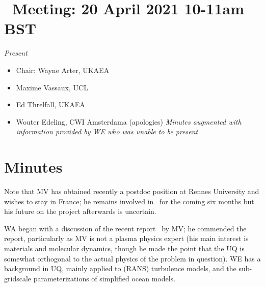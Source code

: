 \section{{\nep\  Meeting: 20 April 2021 10-11am 
BST}}

\emph{Present}

\begin{itemize}
\item Chair: Wayne Arter, UKAEA
\item Maxime Vassaux, UCL
\item Ed Threlfall, UKAEA
\item Wouter Edeling, CWI Amsterdama (apologies) \emph{Minutes augmented with
information provided by WE who was unable to be present}

\end{itemize}

\section{Minutes}


Note that MV has obtained recently a postdoc position at Rennes University and 
wishes to stay in France; he remains involved in \nep\  for the coming six 
months but his future on the project afterwards is uncertain.

WA began with a discussion of the recent report~\cite{2047352_1-TN-01} by MV; 
he commended the report, particularly as MV is not a plasma physics expert (his 
main interest is materials and molecular dynamics, though he made the point 
that the UQ is somewhat orthogonal to the actual physics of the problem in 
question).  WE has a background in UQ, mainly applied to (RANS) turbulence 
models, and the sub-gridscale parameterizations of simplified ocean models.

